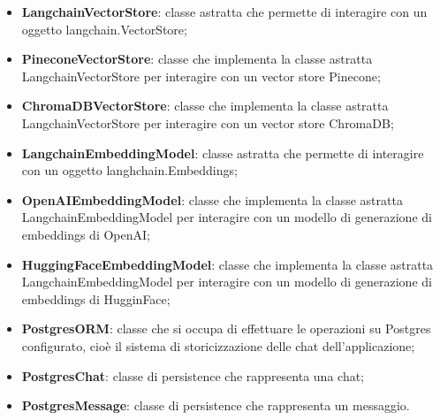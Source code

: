 \documentclass[10pt, a4paper]{article}
\begin{document}
\begin{itemize}
    \item \label{LangchainVectorStore}\textbf{LangchainVectorStore}: classe astratta che permette di interagire con un oggetto langchain.VectorStore;
    \item \label{PineconeVectorStore}\textbf{PineconeVectorStore}: classe che implementa la classe astratta LangchainVectorStore per interagire con un vector store Pinecone;
    \item \label{ChromaDBVectorStore}\textbf{ChromaDBVectorStore}: classe che implementa la classe astratta LangchainVectorStore per interagire con un vector store ChromaDB;
    \item \label{LangchainEmbeddingModel}\textbf{LangchainEmbeddingModel}: classe astratta che permette di interagire con un oggetto langhchain.Embeddings;
    \item \label{OpenAIEmbeddingModel}\textbf{OpenAIEmbeddingModel}: classe che implementa la classe astratta LangchainEmbeddingModel per interagire con un modello di generazione di embeddings di OpenAI;
    \item \label{HuggingFaceEmbeddingModel}\textbf{HuggingFaceEmbeddingModel}: classe che implementa la classe astratta LangchainEmbeddingModel per interagire con un modello di generazione di embeddings di HugginFace;
    \item \label{PostgresORM}\textbf{PostgresORM}: classe che si occupa di effettuare le operazioni su Postgres configurato, cioè il sistema di storicizzazione delle chat dell'applicazione;
    \item \label{PostgresChat}\textbf{PostgresChat}: classe di persistence che rappresenta una chat;
    \item \label{PostgresMessage}\textbf{PostgresMessage}: classe di persistence che rappresenta un messaggio.
\end{itemize}
\end{document}
